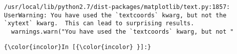 \documentclass{article}
\begin{document}
    \begin{Verbatim}[commandchars=\\\{\}]
/usr/local/lib/python2.7/dist-packages/matplotlib/text.py:1857: UserWarning: You have used the `textcoords` kwarg, but not the `xytext` kwarg.  This can lead to surprising results.
  warnings.warn("You have used the `textcoords` kwarg, but not "
    \end{Verbatim}

    \begin{Verbatim}[commandchars=\\\{\}]
{\color{incolor}In [{\color{incolor} }]:} 
\end{Verbatim}


    
    
    
    
\end{document}
